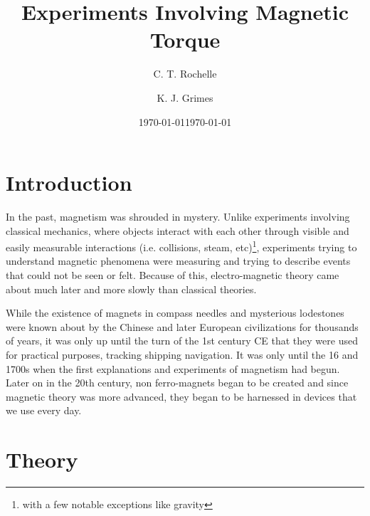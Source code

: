 \documentclass[aps,prl,10pt,twocolumn,floatfix]{revtex4-2}
\begin{document}



\title{Experiments Involving Magnetic Torque}
\author{C. T. Rochelle}
\author{K. J. Grimes}
\date{\today}
\date{\today}

\maketitle

\section{Introduction}\label{Intro}
In the past, magnetism was shrouded in mystery. 
Unlike experiments involving classical mechanics, where objects interact with each other through visible and easily measurable interactions (i.e. collisions, steam, etc)\footnote{with a few notable exceptions like gravity}, experiments trying to understand magnetic phenomena were measuring and trying to describe events that could not be seen or felt.
Because of this, electro-magnetic theory came about much later and more slowly than classical theories. 

While the existence of magnets in compass needles and mysterious lodestones were known about by the Chinese and later European civilizations for thousands of years, it was only up until the turn of the 1st century CE that they were used for practical purposes, tracking shipping navigation\cite{History}.
It was only until the 16 and 1700s when the first explanations and experiments of magnetism had begun. 
Later on in the 20th century, non ferro-magnets began to be created and since magnetic theory was more advanced, they began to be harnessed in devices that we use every day. 
 





\section{Theory}\label{Theory}
\end{document}
